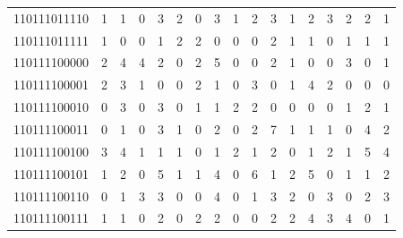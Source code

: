 \documentclass[10pt,a4paper]{article}
\begin{document}
\begin{longtable}{ |c|c|c|c|c|c|c|c|c|c|c|c|c|c|c|c|c| }
    110111011110              & 1                            & 1                                & 0                            & 3                              & 2   & 0   & 3   & 1   & 2   & 3   & 1   & 2   & 3   & 2   & 2   & 1   \\
    110111011111              & 1                            & 0                                & 0                            & 1                              & 2   & 2   & 0   & 0   & 0   & 2   & 1   & 1   & 0   & 1   & 1   & 1   \\
    110111100000              & 2                            & 4                                & 4                            & 2                              & 0   & 2   & 5   & 0   & 0   & 2   & 1   & 0   & 0   & 3   & 0   & 1   \\
    110111100001              & 2                            & 3                                & 1                            & 0                              & 0   & 2   & 1   & 0   & 3   & 0   & 1   & 4   & 2   & 0   & 0   & 0   \\
    110111100010              & 0                            & 3                                & 0                            & 3                              & 0   & 1   & 1   & 2   & 2   & 0   & 0   & 0   & 0   & 1   & 2   & 1   \\
    110111100011              & 0                            & 1                                & 0                            & 3                              & 1   & 0   & 2   & 0   & 2   & 7   & 1   & 1   & 1   & 0   & 4   & 2   \\
    110111100100              & 3                            & 4                                & 1                            & 1                              & 1   & 0   & 1   & 2   & 1   & 2   & 0   & 1   & 2   & 1   & 5   & 4   \\
    110111100101              & 1                            & 2                                & 0                            & 5                              & 1   & 1   & 4   & 0   & 6   & 1   & 2   & 5   & 0   & 1   & 1   & 2   \\
    110111100110              & 0                            & 1                                & 3                            & 3                              & 0   & 0   & 4   & 0   & 1   & 3   & 2   & 0   & 3   & 0   & 2   & 3   \\
    110111100111              & 1                            & 1                                & 0                            & 2                              & 0   & 2   & 2   & 0   & 0   & 2   & 2   & 4   & 3   & 4   & 0   & 1   \\

\end{longtable}
\end{document}
